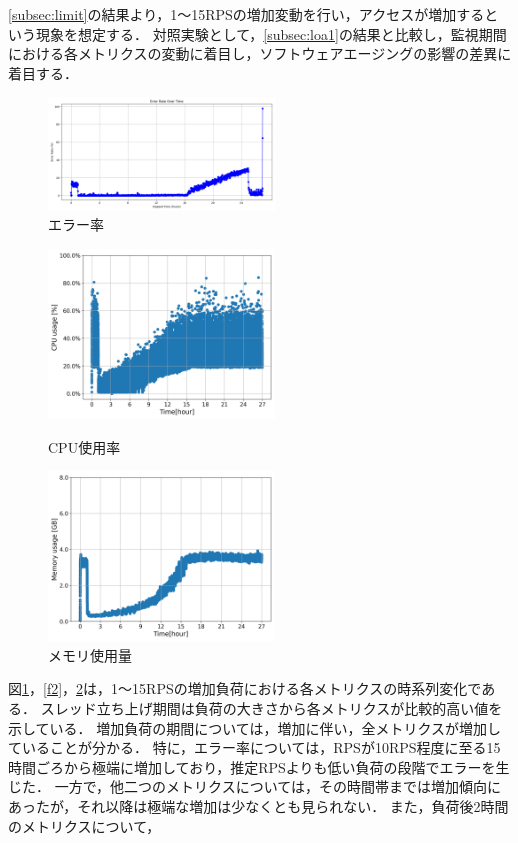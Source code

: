 \documentclass[twoside,twocolumn,10pt]{jarticle}  %
\begin{document}
\ref{subsec:limit}の結果より，1～15RPSの増加変動を行い，アクセスが増加するという現象を想定する．
対照実験として，\ref{subsec:loa1}の結果と比較し，監視期間における各メトリクスの変動に着目し，ソフトウェアエージングの影響の差異に着目する．
\begin{figure}[H]
  \centering
  \includegraphics[scale=0.1,width=60mm]{figures/8core_1_15rps_error_rate.png}
  \caption{エラー率}
  \label{f1}
\end{figure}
\begin{figure}[H]
  \centering
  \includegraphics[scale=0.1,width=60mm]{figures/8core_1_15rps_increase_cpu.png}
  \caption{CPU使用率}
  \label{f2}
  \centering
  \includegraphics[scale=0.1,width=60mm]{figures/8core_1_15rps_increase_mem.png}
  \caption{メモリ使用量}
  \label{f3}
\end{figure}

図\ref{f1}，\ref{f2}，\ref{f3}は，1～15RPSの増加負荷における各メトリクスの時系列変化である．
スレッド立ち上げ期間は負荷の大きさから各メトリクスが比較的高い値を示している．
増加負荷の期間については，増加に伴い，全メトリクスが増加していることが分かる．
特に，エラー率については，RPSが10RPS程度に至る15時間ごろから極端に増加しており，推定RPSよりも低い負荷の段階でエラーを生じた．
一方で，他二つのメトリクスについては，その時間帯までは増加傾向にあったが，それ以降は極端な増加は少なくとも見られない．
また，負荷後2時間のメトリクスについて，
\end{document}
